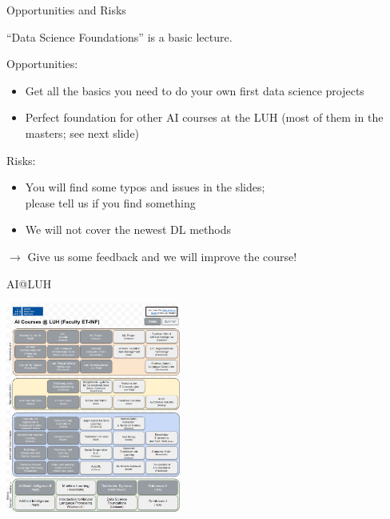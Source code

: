 \documentclass[aspectratio=169,handout]{../latex_main/tntbeamer}  %
\begin{document}
\begin{frame}[c]{Opportunities and Risks}

``Data Science Foundations'' is a basic lecture.

\bigskip
\pause

Opportunities:
\begin{itemize}
  \item Get all the basics you need to do your own first data science projects
  \item Perfect foundation for other AI courses at the LUH (most of them in the masters; see next slide)
\end{itemize}

\medskip

Risks:
\begin{itemize}
  \item You will find some typos and issues in the slides;\\ please tell us if you find something
  \item We will not cover the newest DL methods
\end{itemize}

\medskip
$\to$ Give us some feedback and we will improve the course!

\end{frame}
\begin{frame}[c]{AI@LUH}

\vspace{-2em}
\centering
\includegraphics[width=0.43\textwidth]{figures/AI_Courses_LUH}

\end{frame}
\end{document}
